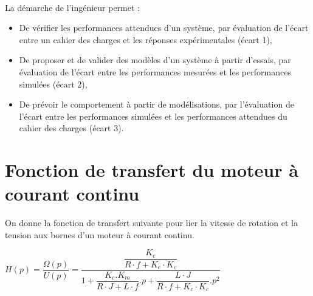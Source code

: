 

 \\

\graphicspath{{../../../img/}}
\begin{center}
\def\svgwidth{\columnwidth}

\end{center}

La démarche de l’ingénieur permet :
\begin{itemize}
 \item De vérifier les performances attendues d’un système, par évaluation de l’écart entre un cahier des charges et les réponses expérimentales (écart 1),
 \item De proposer et de valider des modèles d’un système à partir d’essais, par évaluation de l’écart entre les performances mesurées et les performances simulées (écart 2),
 \item De prévoir le comportement à partir de modélisations, par l’évaluation de l’écart entre les performances simulées et les performances attendues du cahier des charges (écart 3).
\end{itemize}

\newpage

\newpage

\section{Fonction de transfert du moteur à courant continu}

On donne la fonction de transfert suivante pour lier la vitesse de rotation et la tension aux bornes d'un moteur à courant continu.

\begin{center}
$H(p)=\dfrac{\Omega(p)}{U(p)}=\dfrac{\dfrac{K_c}{R\cdot f+K_e\cdot K_c}}{1+\dfrac{K_e.K_m}{R\cdot J+L\cdot f}.p+\dfrac{L\cdot J}{R\cdot f+K_e\cdot K_c}.p^2}$
\end{center}

